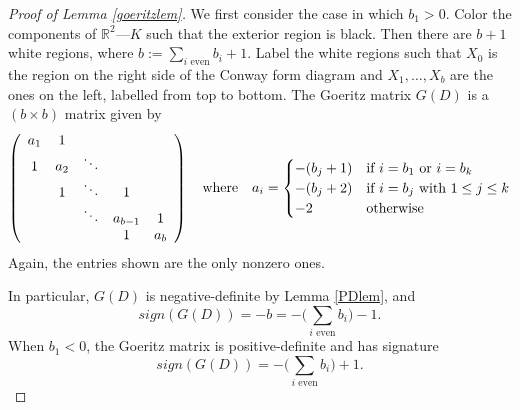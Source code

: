 \documentclass[11pt]{article}
\theoremstyle{plain} \newtheorem{thm}{Theorem}[subsection]
\theoremstyle{plain} \newtheorem{cor}[thm]{Corollary}
\theoremstyle{plain} \newtheorem{prop}[thm]{Proposition}
\theoremstyle{plain} \newtheorem{conj}[thm]{Conjecture}
\theoremstyle{plain} \newtheorem{lem}[thm]{Lemma}
\theoremstyle{definition} \newtheorem{df}[thm]{Definition}
\theoremstyle{remark} \newtheorem{rmk}[thm]{Remark}
\theoremstyle{remark} \newtheorem{obs}[thm]{Observation}
\numberwithin{equation}{section}
\begin{document}
\begin{proof}[Proof of Lemma \ref{goeritzlem}]
We first consider the case in which $b_{1} > 0$.  Color the components of $\mathbb{R}^{2}$---$K$ such that the exterior region is black.  Then there are $b+1$ white regions, where $ b:=\displaystyle\sum_{i\text{ even}}  b_{i} + 1$.
 Label the white regions such that $X_0$ is the region on the right side of the Conway form diagram and $X_1, \dots, X_{b}$ are the ones on the left, labelled from top to bottom.  The Goeritz matrix $G(D)$ is a $(b \times b)$ matrix given by
 $$
\left(\begin{array}{ccccc}
a_1 & 1 & & &\\
1 & a_2 & \ddots & &\\
& 1 & \ddots & 1 &\\
& & \ddots & a_{b-1} & 1 \\
& & & 1 &a_b
\end{array}\right)
\quad \text{where} \quad
a_{i} = \begin{cases}
	-(b_{j} + 1) & \text{if $i = b_1$ or $i = b_k$}\\
	-(b_{j} + 2) & \text{if $i = b_j$ with $ 1 \leq j \leq k$}\\
	-2 & \text{otherwise}
\end{cases}
$$
Again, the entries shown are the only nonzero ones.

%


In particular, $G(D)$ is negative-definite by Lemma \ref{PDlem}, and
\begin{equation*}
sign(G(D)) = -b = -\bigg(\displaystyle\sum_{i\text{ even}}b_{i} \bigg) - 1.
\end{equation*}
When $b_{1} < 0$, the Goeritz matrix is positive-definite and has signature
\begin{equation*}
sign(G(D)) = -\bigg(\displaystyle\sum_{i\text{ even}}b_{i} \bigg) + 1.
\end{equation*}
\end{proof}
\end{document}
